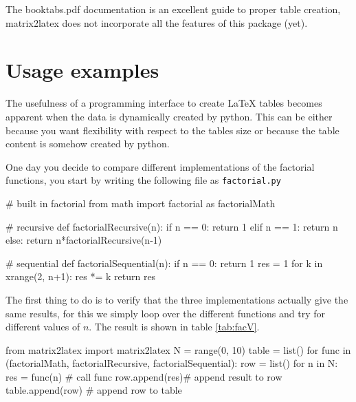 {{The booktabs.pdf documentation is an excellent guide to proper table creation,
matrix2latex does not incorporate all the features of this package (yet).

\section{Usage examples}
The usefulness of a programming interface to create \LaTeX{}
tables becomes apparent when the data is dynamically created by python.
This can be either because you want flexibility with respect to the tables size
or because the table content is somehow created by python.

One day you decide to compare different implementations of the
factorial functions, you start by writing the following file
as \verb!factorial.py!
\begin{pyblock}[factorial]
# built in factorial
from math import factorial as factorialMath

# recursive
def factorialRecursive(n):
    if n == 0:
        return 1
    elif n == 1:
        return n
    else:
        return n*factorialRecursive(n-1)

# sequential
def factorialSequential(n):
    if n == 0:
        return 1
    res = 1
    for k in xrange(2, n+1):
        res *= k
    return res  
\end{pyblock}

The first thing to do is to verify that the three implementations actually give
the same results, for this we simply loop over the different functions and try for
different values of $n$. The result is shown in table \ref{tab:facV}.
\begin{pyblock}[factorial]
from matrix2latex import matrix2latex
N = range(0, 10)
table = list()
for func in (factorialMath,
             factorialRecursive,
             factorialSequential):
    row = list()
    for n in N:
        res = func(n)  # call func
        row.append(res)# append result to row
    table.append(row)  # append row to table


\end{pyblock}}}
